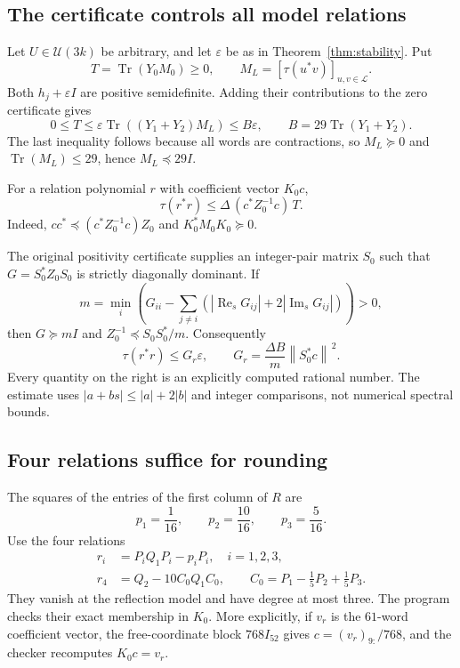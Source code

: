 \documentclass[11pt]{article}
\theoremstyle{remark}\newtheorem{remark}[theorem]{Remark}
\newcommand{\U}{\mathcal U}
\newcommand{\Tr}{\operatorname{Tr}}
\newcommand{\norm}[1]{\left\lVert#1\right\rVert}
\newcommand{\Lwords}{\mathcal L}
\begin{document}
\subsection{The certificate controls all model relations}
Let $U\in\U(3k)$ be arbitrary, and let $\varepsilon$ be as in Theorem~\ref{thm:stability}. Put
\[
 T=\Tr(Y_0M_0)\ge0,\qquad
 M_L=[\tau(u^*v)]_{u,v\in\Lwords}.
\]
Both $h_j+\varepsilon I$ are positive semidefinite. Adding their contributions to the zero certificate gives
\begin{equation}\label{eq:Tbound}
 0\le T\le\varepsilon\Tr((Y_1+Y_2)M_L)
 \le B\varepsilon,\qquad B=29\Tr(Y_1+Y_2).
\end{equation}
The last inequality follows because all words are contractions, so $M_L\succeq0$ and $\Tr(M_L)\le29$, hence $M_L\preceq29I$.

For a relation polynomial $r$ with coefficient vector $K_0c$,
\begin{equation}\label{eq:relation-estimate}
 \tau(r^*r)\le\Delta\,(c^*Z_0^{-1}c)\,T.
\end{equation}
Indeed, $cc^*\preceq(c^*Z_0^{-1}c)Z_0$ and $K_0^*M_0K_0\succeq0$.

The original positivity certificate supplies an integer-pair matrix $S_0$ such that $G=S_0^*Z_0S_0$ is strictly diagonally dominant. If
\[
 m=\min_i\left(G_{ii}-\sum_{j\ne i}(|\operatorname{Re}_sG_{ij}|+2|\operatorname{Im}_sG_{ij}|)\right)>0,
\]
then $G\succeq mI$ and $Z_0^{-1}\preceq S_0S_0^*/m$. Consequently
\begin{equation}\label{eq:exact-G-r}
 \tau(r^*r)\le G_r\varepsilon,\qquad
 G_r=\frac{\Delta B}{m}\norm{S_0^*c}^{\,2}.
\end{equation}
Every quantity on the right is an explicitly computed rational number. The estimate uses $|a+bs|\le|a|+2|b|$ and integer comparisons, not numerical spectral bounds.

\subsection{Four relations suffice for rounding}
The squares of the entries of the first column of $R$ are
\[
 p_1=\frac1{16},\qquad p_2=\frac{10}{16},\qquad p_3=\frac5{16}.
\]
Use the four relations
\begin{align}
 r_i&=P_iQ_1P_i-p_iP_i,\quad i=1,2,3,\label{eq:r123}\\
 r_4&=Q_2-10C_0Q_1C_0,\qquad
 C_0=P_1-\frac15P_2+\frac15P_3.\label{eq:r4}
\end{align}
They vanish at the reflection model and have degree at most three. The program  checks their exact membership in $K_0$. More explicitly, if $v_r$ is the $61$-word coefficient vector, the free-coordinate block $768I_{52}$ gives $c=(v_r)_{9:}/768$, and the checker recomputes $K_0c=v_r$.
\end{document}
